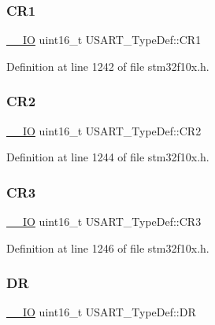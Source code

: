 \subsubsection{\texorpdfstring{C\+R1}{CR1}}
{\footnotesize\ttfamily \hyperlink{core__sc300_8h_aec43007d9998a0a0e01faede4133d6be}{\+\_\+\+\_\+\+IO} uint16\+\_\+t U\+S\+A\+R\+T\+\_\+\+Type\+Def\+::\+C\+R1}



Definition at line 1242 of file stm32f10x.\+h.

\mbox{\label{struct_u_s_a_r_t___type_def_a2a494156d185762e4596696796c393bc}} 
\subsubsection{\texorpdfstring{C\+R2}{CR2}}
{\footnotesize\ttfamily \hyperlink{core__sc300_8h_aec43007d9998a0a0e01faede4133d6be}{\+\_\+\+\_\+\+IO} uint16\+\_\+t U\+S\+A\+R\+T\+\_\+\+Type\+Def\+::\+C\+R2}



Definition at line 1244 of file stm32f10x.\+h.

\mbox{\label{struct_u_s_a_r_t___type_def_a2b9d1df38cb1d745305c8190a8707a0f}} 
\subsubsection{\texorpdfstring{C\+R3}{CR3}}
{\footnotesize\ttfamily \hyperlink{core__sc300_8h_aec43007d9998a0a0e01faede4133d6be}{\+\_\+\+\_\+\+IO} uint16\+\_\+t U\+S\+A\+R\+T\+\_\+\+Type\+Def\+::\+C\+R3}



Definition at line 1246 of file stm32f10x.\+h.

\mbox{\label{struct_u_s_a_r_t___type_def_accee34aaec89aad4aeef512bba173ae5}} 
\subsubsection{\texorpdfstring{DR}{DR}}
{\footnotesize\ttfamily \hyperlink{core__sc300_8h_aec43007d9998a0a0e01faede4133d6be}{\+\_\+\+\_\+\+IO} uint16\+\_\+t U\+S\+A\+R\+T\+\_\+\+Type\+Def\+::\+DR}



